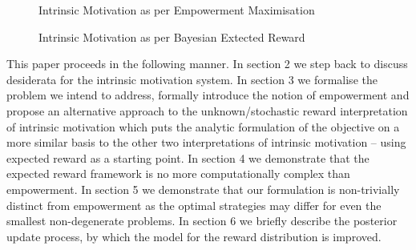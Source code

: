 \documentclass{article}
\begin{document}
\begin{figure}[h]
\centering
{}
\caption{Intrinsic Motivation as per Empowerment Maximisation} \label{fig:M3}
\end{figure}

\begin{figure}[h]
\centering
{}
\caption{Intrinsic Motivation as per Bayesian Extected Reward} \label{fig:M4}
\end{figure}

This paper proceeds in the following manner. In section 2 we step back to discuss desiderata for the intrinsic motivation system. In section 3 we formalise the problem we intend to address, formally introduce the notion of empowerment and propose an alternative approach to the unknown/stochastic reward interpretation of intrinsic motivation which puts the analytic formulation of the objective on a more similar basis to the other two interpretations of intrinsic motivation -- using expected reward as a starting point. In section 4 we demonstrate that the expected reward framework is no more computationally complex than empowerment. In section 5 we demonstrate that our formulation is non-trivially distinct from empowerment as the optimal strategies may differ for even the smallest non-degenerate problems. In section 6 we briefly describe the posterior update process, by which the model for the reward distribution is improved.  
\end{document}
